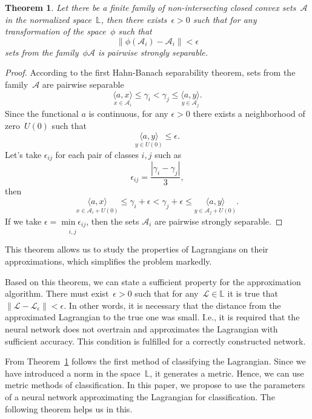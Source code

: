 \documentclass[sn-mathphys-num]{sn-jnl}
\theoremstyle{thmstylethree}
\theoremstyle{thmstyletwo}
\theoremstyle{thmstyleone}
\newtheorem{theorem}{Theorem}
\begin{document}
\begin{theorem} \label{main_theorem}
Let there be a finite family of non-intersecting closed convex sets~$\mathcal{A}$ in the
normalized space~$\mathbb{L}$, then there exists~$\epsilon > 0$ such that for any transformation of the space~$\phi$ such that 
\[
\|\phi(\mathcal{A}_{i}) - \mathcal{A}_{i}\| < \epsilon
\]
sets from the family~$\phi{\mathcal{A}}$ is pairwise strongly separable.
\end{theorem}

\begin{proof}
According to the first Hahn-Banach separability theorem, sets from the family~$\mathcal{A}$ are
pairwise separable
\[ 
\underset{x \in \mathcal{A}_{i}}{\langle a, x \rangle}\leq \gamma_{i} < \gamma_{j} \leq \underset{y \in \mathcal{A}_{j}}{\langle a, y \rangle}.
\]
Since the functional $a$ is continuous, for any $\epsilon > 0$ there exists a neighborhood of zero~$U(0)$ such that 
\[
\underset{y \in U(0)}{\langle a, y \rangle} \leq \epsilon.
\]
Let's take $\epsilon_{ij}$ for each pair of classes $i, j$ such as
\[
\epsilon_{ij} = \frac{|\gamma_{i} - \gamma_{j}|}{3},\]
then
\[
\underset{x \in \mathcal{A}_{i} + U(0)}{\langle a, x \rangle}\leq \gamma_{i} + \epsilon < \gamma_{j} + \epsilon \leq \underset{y \in \mathcal{A}_{j} + U(0)}{\langle a, y \rangle}.\]
If we take $\epsilon = \underset{i, j}{\min{\epsilon_{ij}}}$, then the sets $\mathcal{A}_{i}$ are pairwise strongly separable.
\end{proof}

This theorem allows us to study the properties of Lagrangians on their approximations,
which simplifies the problem markedly.

Based on this theorem, we can state a sufficient property for the approximation algorithm.
There must exist~$\epsilon > 0$ such that for any~$\mathcal{L} \in \mathbb{L}$ it is true that~$\|\mathcal{L}- \mathcal{L}_{\epsilon}\| < \epsilon$. In other words, it is necessary that the distance from the approximated Lagrangian to the true one was small. I.e., it is required that the neural network does not overtrain and approximates the Lagrangian with sufficient accuracy. This condition is fulfilled for a correctly constructed network.

From Theorem~\ref{main_theorem} follows the first method of classifying the Lagrangian. Since we have introduced a norm in the space~$\mathbb{L}$, it generates a metric. Hence, we can use metric methods of classification. In this paper, we propose to use the parameters of a neural network approximating the Lagrangian for classification. The following theorem helps us in this.
\end{document}
